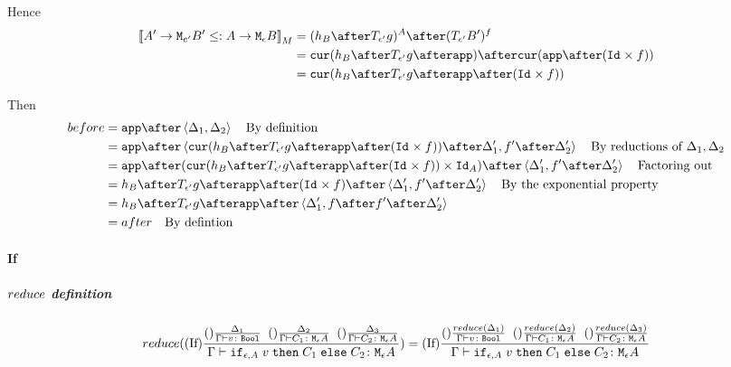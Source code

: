 {                Hence 
                \begin{align}
                    \deno{\lamtype{A'}{e'}{B'}\subtype \aeb} & = (h_B\after\T{\e'}{g})^A \after (\T{\e'}{B'})^f \\
                    & = \cur{h_B\after\T{\e'}{g}\after \app}\after\cur{\app\after(\Id{}\times f)}\\
                    & = \cur {h_B\after\T{\e'}{g}\after\app\after(\Id{}\times f)}
                \end{align}

                Then 
                \begin{align}
                    before & = \app\after\pr{\D_1}{\D_2}\qt{By definition}\\
                    & = \app\after\pr{\cur {h_B\after\T{\e'}{g}\after\app\after(\Id{}\times f)}\after\D'_1}{f'\after\D'_2}\qt{By reductions of $\D_1, \D_2$}\\
                    & = \app\after(\cur {h_B\after\T{\e'}{g}\after\app\after(\Id{}\times f)}\times\Id{A})\after\pr{\D'_1}{f'\after\D'_2} \qt{Factoring out}\\
                    & = h_B\after\T{\e'}{g}\after\app\after(\Id{}\times f)\after\pr{\D'_1}{f'\after\D'_2}\qt{By the exponential property}\\
                    & = h_B\after\T{\e'}{g}\after\app\after\pr{\D'_1}{f\after f'\after \D'_2}\\
                    & = after\qt{By defintion}
                \end{align}
            \paragraph{If}
           
            \subparagraph{$reduce$ definition}
                \begin{equation}
                    reduce((\text{If}) \frac{
                        (\text{}) \frac{\Delta_1}{\Gamma \vdash v \colon \texttt{Bool}}
                        \;\;
                        (\text{}) \frac{\Delta_2}{\Gamma \vdash C_1 \colon \texttt{M}_{\epsilon}{A}}
                        \;\;
                        (\text{}) \frac{\Delta_3}{\Gamma \vdash C_2 \colon \texttt{M}_{\epsilon}{A}}
                    }{
                        \Gamma \vdash \texttt{if}_{\epsilon, A}\; v\; \texttt{then}\; C_1 \;\texttt{else} \; C_2 \colon \texttt{M}_{\epsilon}{A}
                    }) = (\text{If}) \frac{
                        (\text{}) \frac{reduce(\Delta_1)}{\Gamma \vdash v \colon \texttt{Bool}}
                        \;\;
                        (\text{}) \frac{reduce(\Delta_2)}{\Gamma \vdash C_1 \colon \texttt{M}_{\epsilon}{A}}
                        \;\;
                        (\text{}) \frac{reduce(\Delta_3)}{\Gamma \vdash C_2 \colon \texttt{M}_{\epsilon}{A}}
                    }{
                        \Gamma \vdash \texttt{if}_{\epsilon, A}\; v\; \texttt{then}\; C_1 \;\texttt{else} \; C_2 \colon \texttt{M}_{\epsilon}{A}
                    }
                \end{equation}

}
